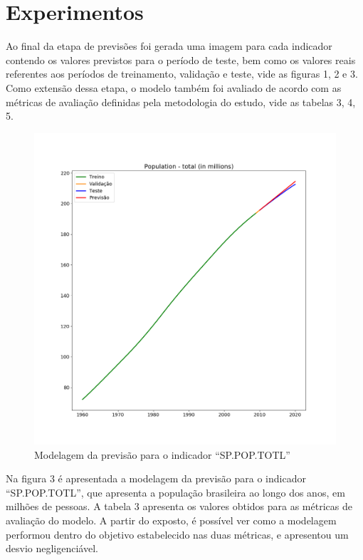 \section{Experimentos}

Ao final da etapa de previsões foi gerada uma imagem para cada indicador contendo os 
valores previstos para o período de teste, bem como os valores reais referentes aos 
períodos de treinamento, validação e teste, vide as figuras 1, 2 e 3.  Como extensão 
dessa etapa, o modelo também foi avaliado de acordo com as métricas de avaliação 
definidas pela metodologia do estudo, vide as tabelas 3, 4, 5.

\begin{figure}[h!]
    \centering
    \includegraphics[scale=0.35]{images/Figure_1}
    \caption{Modelagem da previsão para o indicador “SP.POP.TOTL”}
\end{figure}

Na figura 3 é apresentada a modelagem da previsão para o indicador “SP.POP.TOTL”, que apresenta a população 
brasileira ao longo dos anos, em milhões de pessoas. A tabela 3 apresenta os valores 
obtidos para as métricas de avaliação do modelo. A partir do exposto, é possível ver como a 
modelagem performou dentro do objetivo estabelecido nas duas métricas, e apresentou um desvio negligenciável.


